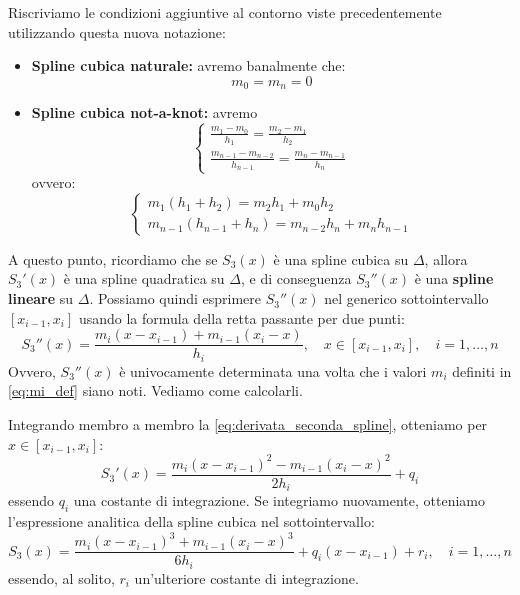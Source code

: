 Riscriviamo le condizioni aggiuntive al contorno viste precedentemente utilizzando questa nuova notazione:
\begin{itemize}
    \item \textbf{Spline cubica naturale:} avremo banalmente che:
    \begin{equation}\label{eq:cond_naturale_mi}
    m_0 = m_n = 0 
    \end{equation}
    
    \item \textbf{Spline cubica not-a-knot:} avremo
    \begin{equation*}
    \begin{cases}
    \frac{m_1 - m_0}{h_1} = \frac{m_2 - m_1}{h_2} \\[2ex]
    \frac{m_{n-1} - m_{n-2}}{h_{n-1}} = \frac{m_n - m_{n-1}}{h_n}
    \end{cases}
    \end{equation*}
    ovvero:
    \begin{equation} \label{eq:cond_notaknot_mi}
    \begin{cases}
    m_1 (h_1+h_2) = m_2 h_1 + m_0 h_2 \\
    m_{n-1} (h_{n-1}+h_n) = m_{n-2} h_n + m_n h_{n-1}
    \end{cases} 
    \end{equation}
\end{itemize}

A questo punto, ricordiamo che se $S_3(x)$ è una spline cubica su $\Delta$, allora $S_3'(x)$ è una spline quadratica su $\Delta$, e di conseguenza $S_3''(x)$ è una \textbf{spline lineare} su $\Delta$.
Possiamo quindi esprimere $S_3''(x)$ nel generico sottointervallo $[x_{i-1}, x_i]$ usando la formula della retta passante per due punti:
\begin{equation} \label{eq:derivata_seconda_spline}
S_3''(x) = \frac{m_i(x - x_{i-1}) + m_{i-1}(x_i - x)}{h_i}, \quad x \in [x_{i-1}, x_i], \quad i=1, \dots, n
\end{equation}
Ovvero, $S_3''(x)$ è univocamente determinata una volta che i valori $m_i$ definiti in \eqref{eq:mi_def} siano noti. Vediamo come calcolarli.

Integrando membro a membro la \eqref{eq:derivata_seconda_spline}, otteniamo per $x \in [x_{i-1}, x_i]$:
\begin{equation}\label{eq:derivata_prima_spline}
S_3'(x) = \frac{m_i(x - x_{i-1})^2 - m_{i-1}(x_i - x)^2}{2h_i} + q_i
\end{equation}
essendo $q_i$ una costante di integrazione.
Se integriamo nuovamente, otteniamo l'espressione analitica della spline cubica nel sottointervallo:
\begin{equation} \label{eq:spline_esplicita}
S_3(x) = \frac{m_i(x - x_{i-1})^3 + m_{i-1}(x_i - x)^3}{6h_i} + q_i(x - x_{i-1}) + r_i, \quad i=1, \dots, n
\end{equation}
essendo, al solito, $r_i$ un'ulteriore costante di integrazione.

